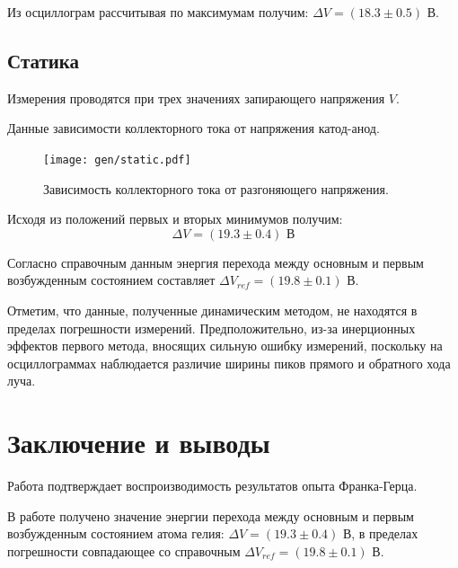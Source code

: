 \documentclass[12pt,a4paper]{article}
\begin{document}
	Из осциллограм рассчитывая по максимумам получим: $\Delta V = (18.3 \pm 0.5)$ В.

	\newpage
	\subsection*{Статика}
	
	Измерения проводятся при трех значениях запирающего напряжения $V$.
	
	\begin{table}[H]
		\scriptsize
		
		\caption{Данные зависимости коллекторного тока от напряжения катод-анод.}
		\label{tab:data}
	\end{table}
	
	\begin{figure}[H]
		\centering
		\texttt{[image: gen/static.pdf]}
		\caption{Зависимость коллекторного тока от разгоняющего напряжения.}
		\label{fig:static}
	\end{figure}
	
	Исходя из положений первых и вторых минимумов получим:
	\begin{equation}
		\Delta V = (19.3 \pm 0.4) \text{ В}
	\end{equation}
	
	Согласно справочным данным энергия перехода между основным и первым возбужденным состоянием составляет $\Delta V_{ref} = (19.8 \pm 0.1)$ В.
	
	Отметим, что данные, полученные динамическим методом, не находятся в пределах погрешности измерений. Предположительно, из-за инерционных эффектов первого метода, вносящих сильную ошибку измерений, поскольку на осциллограммах наблюдается различие ширины пиков прямого и обратного хода луча.

	\section*{Заключение и выводы}
	
	Работа подтверждает воспроизводимость результатов опыта Франка-Герца.
	
	В работе получено значение энергии перехода между основным и первым возбужденным состоянием атома гелия: $\Delta V = (19.3 \pm 0.4)$ В, в пределах погрешности совпадающее со справочным $\Delta V_{ref} = (19.8 \pm 0.1)$ В. 
\end{document}
